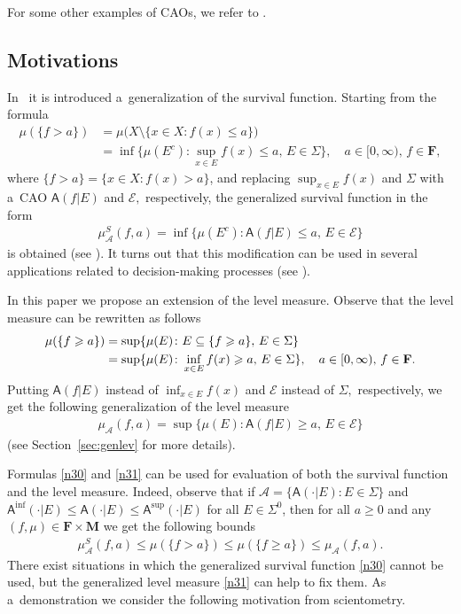 \documentclass[preprint,11pt]{elsarticle}
\theoremstyle{definition}
\newcommand\bF{\mathbf{F}} %
\newcommand\bM{\mathbf{M}} %
\newcommand\cE{{\mathcal E}}
\newcommand\sA{\mathsf{A}}
\newcommand\aA[2][E]{\sA(#2|#1)}%
\newcommand\bA{\mathscr{A}}%
\newcommand\mub[1][\bA]{\mu_{#1}}
\renewcommand\ge{\geqslant}
\renewcommand\le{\leqslant}
\newcommand{\tx}{\textstyle{}}
\begin{document}
For some other examples of CAOs, we refer to \cite{BHHK21,BHK22}.

\subsection{\textbf{Motivations}}\label{sec:2.3}

In~\cite{BHHK21} it is introduced a~generalization of the survival function. Starting from the formula
\begin{align*}
\mu(\{f>a\})&= \mu\big(X\setminus \{x\in X\colon f(x)\leqslant a\}\big)
\\&=\inf\big\{\mu (E^c)\colon \sup_{x\in E} f(x)\le a,\, E\in \Sigma\big\},\quad a\in [0,\infty), \, f\in \bF,
\end{align*}
where $\{f>a\}=\{x\in X\colon f(x)>a\}$,
and replacing ${\tx \sup_{x\in E} f(x)}$ and $\Sigma$ with a~CAO $\sA(f|E)$ and  $\cE,$ respectively,
the generalized survival function in the form
\begin{align}\label{n30}
    \mub^S(f,a)=\inf\big\{\mu(E^c)\colon \sA(f|E)\le a,\, E\in \cE\big\}
\end{align}
is obtained (see \cite[Def. 4.1]{BHHK21}). It turns out that this modification can be used in several applications related to decision-making processes (see \cite[Sec. 2 and 6]{BHHK21}).

In this paper we propose an extension of the level measure. Observe that the level measure can be rewritten as follows
\begin{align*}
    \mu(\{f\ge a\})&=\sup\{\mu(E)\colon E\subseteq \{f\ge a\},\,E\in \Sigma\}\notag
    \\&=\sup\{\mu(E)\colon \inf_{x\in E} f(x)\ge a,\, E\in \Sigma\},\quad  a\in [0,\infty), \, f\in \bF.
\end{align*}
Putting  $\sA(f|E)$ instead of ${\tx \inf_{x\in E} f(x)}$ and  $\cE$ instead of $\Sigma,$ respectively, we get the following generalization of the level measure
\begin{align}\label{n31}
    \mub(f,a)=\sup\big\{\mu(E)\colon \aA{f}\ge a,\, E\in \cE\big\}
\end{align}
(see Section~\ref{sec:genlev} for more details).

Formulas \eqref{n30} and \eqref{n31} can be used for evaluation of both the survival function and the level measure.
Indeed, observe that if $\bA=\{\sA(\cdot|E)\colon E\in \Sigma\}$ and $\sA^{\inf}(\cdot|E)\le \aA{\cdot}\le \sA^{\sup}(\cdot|E)$ for all $E\in \Sigma^0$, then for all $a\ge 0$ and any $(f,\mu)\in \bF\times \bM$ we get the following bounds
\begin{align}\label{n4}
  \mub^S(f,a) \le \mu(\{f>a\})\le \mu(\{f\ge a\})\le \mub(f,a).
\end{align}
There exist situations in which the generalized survival function \eqref{n30} cannot be used, but the generalized level measure \eqref{n31} can help to fix them.  As a~demonstration we consider the following motivation from scientometry.
\end{document}
